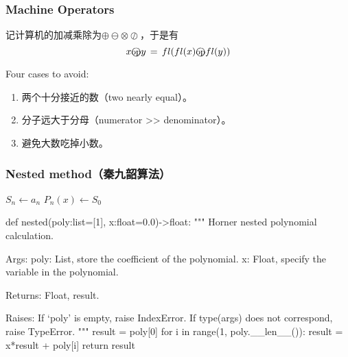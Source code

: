 \subsubsection{Machine Operators}
记计算机的加减乘除为$\oplus\ominus\otimes\oslash$，于是有
$$x\op y\,=\,fl(fl(x)\op fl(y))$$\par
Four cases to avoid:
\begin{enumerate}
    \item 两个十分接近的数（two nearly equal）。
    \item 分子远大于分母（numerator >> denominator）。
    \item 避免大数吃掉小数。
\end{enumerate}

\subsubsection{Nested method（秦九韶算法）}
\IncMargin{1em}
\begin{algorithm}
\BlankLine
    $S_n\leftarrow a_n$\;
    $P_n(x)\leftarrow S_0$\;
\end{algorithm}
\begin{python}
def nested(poly:list=[1], x:float=0.0)->float:
    """
    Horner nested polynomial calculation.

    Args:
        poly: List, store the coefficient of the polynomial.
        x: Float, specify the variable in the polynomial.

    Returns:
        Float, result.

    Raises:
        If `poly' is empty, raise IndexError.
        If type(args) does not correspond, raise TypeError.
    """
    result = poly[0]
    for i in range(1, poly.__len__()):
        result = x*result + poly[i]
    return result
\end{python}

